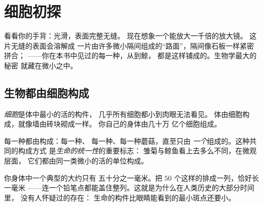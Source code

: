 \chapter{细胞初探}\label{ch:g5:first-look-at-cells}

看看你的手背：光滑，表面完整无缝。
现在想象一个能放大一千倍的放大镜。
这片无缝的表面会溶解成
一片由许多微小隔间组成的“路面”，隔间像石板一样紧密拼合；
——你在本书中见过的每一种，从到鲸，
都是这样铺成的。生物学最大的秘密
就藏在微小之中。

\section{生物都由细胞构成}

\begin{definition}[细胞]\label{def:g5:first-look-at-cells:cell}
\emph{细胞}是体中最小的活的构件，
几乎所有细胞都小到肉眼无法看见。
体由细胞构成，就像墙由砖块砌成一样。
你自己的身体由几十万
亿个细胞组成。
\end{definition}

\begin{proposition}[细胞学说]\label{prop:g5:first-look-at-cells:principle}
每一种都由构成：每一种、
每一种、每一种蘑菇，直至只由
\emph{一个}组成的。这种共同的构成方式
是\emph{生命的统一性}的重要标志：
雏菊与鲸鱼看上去多么不同，在微观层面，
它们都由同一类微小的活的单位构成。
\end{proposition}
\admitted

\begin{example}[细胞有多小？]\label{ex:g5:first-look-at-cells:small}
你身体中一个典型的大约只有
五十分之一毫米。把 $50$ 个这样的排成一列，恰好长一毫米
——连一个铅笔点都能盖住整列。这就是为什么在人类历史的大部分时间里，
没有人怀疑过的存在：
生命的构件比眼睛能看到的最小斑点还要小。
\end{example}

